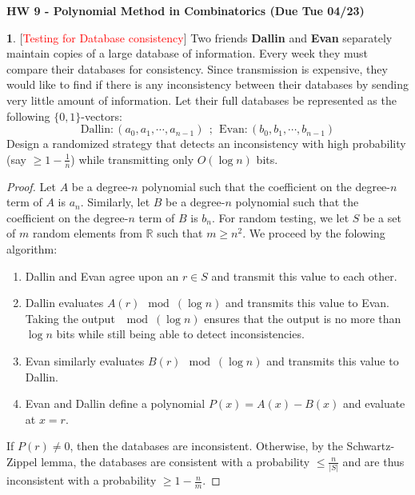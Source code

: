 \documentclass[10pt]{article}
\begin{document}
\begin{center}
\textbf{\Large{HW 9 - Polynomial Method in Combinatorics (Due Tue 04/23)}}
\end{center}
\medskip

\textbf{1}. [\textcolor{red}{Testing for Database consistency}] Two friends \textbf{Dallin} and \textbf{Evan} separately maintain copies of a large database of information. Every week they must compare their databases for consistency. Since transmission is expensive, they would like to find if there is any inconsistency between their databases by sending very little amount of information. Let their full databases be represented as the following $\{0,1\}$-vectors: $$\text{Dallin}: (a_0,a_1,\cdots, a_{n-1})~~;~~\text{Evan}: (b_0,b_1,\cdots, b_{n-1})$$ Design a randomized strategy that detects an inconsistency with high probability \big(say $\ge 1-\frac{1}{n}$\big) while transmitting only $O(\log n)$ bits.\\ %

\begin{proof}
    Let $A$ be a degree-$n$ polynomial such that the coefficient on the degree-$n$ term of $A$ is $a_n$. Similarly, let $B$ be a degree-$n$ polynomial such that the coefficient on the degree-$n$ term of $B$ is $b_n$. For random testing, we let $S$ be a set of $m$ random elements from $\mathbb{R}$ such that $m \ge n^2$. We proceed by the folowing algorithm:

    \begin{enumerate}
        \item Dallin and Evan agree upon an $r \in S$ and transmit this value to each other.
        \item Dallin evaluates $A(r) \mod (\log n)$ and transmits this value to Evan. Taking the output $\mod (\log n)$ ensures that the output is no more than $\log n$ bits while still being able to detect inconsistencies.
        \item Evan similarly evaluates $B(r)\mod (\log n)$ and transmits this value to Dallin.
        \item Evan and Dallin define a polynomial $P(x) = A(x) - B(x)$ and evaluate at $x=r$.
    \end{enumerate}
    
    If $P(r) \ne 0$, then the databases are inconsistent. Otherwise, by the Schwartz-Zippel lemma, the databases are consistent with a probability $\le \frac{n}{|S|}$ and are thus inconsistent with a probability $\ge 1 - \frac{n}{m}$.
\end{proof}
\end{document}
